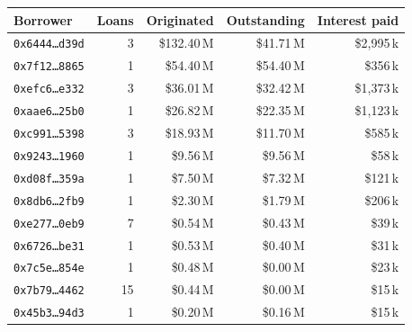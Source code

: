 \begin{tabular}{@{}lrrrr@{}}
\toprule
Borrower & Loans & Originated & Outstanding & Interest paid \\
\midrule
\texttt{0x6444\ldots{}d39d} & 3 & \$132.40\,M & \$41.71\,M & \$2,995\,k \\
\texttt{0x7f12\ldots{}8865} & 1 & \$54.40\,M & \$54.40\,M & \$356\,k \\
\texttt{0xefc6\ldots{}e332} & 3 & \$36.01\,M & \$32.42\,M & \$1,373\,k \\
\texttt{0xaae6\ldots{}25b0} & 1 & \$26.82\,M & \$22.35\,M & \$1,123\,k \\
\texttt{0xc991\ldots{}5398} & 3 & \$18.93\,M & \$11.70\,M & \$585\,k \\
\texttt{0x9243\ldots{}1960} & 1 & \$9.56\,M & \$9.56\,M & \$58\,k \\
\texttt{0xd08f\ldots{}359a} & 1 & \$7.50\,M & \$7.32\,M & \$121\,k \\
\texttt{0x8db6\ldots{}2fb9} & 1 & \$2.30\,M & \$1.79\,M & \$206\,k \\
\texttt{0xe277\ldots{}0eb9} & 7 & \$0.54\,M & \$0.43\,M & \$39\,k \\
\texttt{0x6726\ldots{}be31} & 1 & \$0.53\,M & \$0.40\,M & \$31\,k \\
\texttt{0x7c5e\ldots{}854e} & 1 & \$0.48\,M & \$0.00\,M & \$23\,k \\
\texttt{0x7b79\ldots{}4462} & 15 & \$0.44\,M & \$0.00\,M & \$15\,k \\
\texttt{0x45b3\ldots{}94d3} & 1 & \$0.20\,M & \$0.16\,M & \$15\,k \\
\bottomrule
\end{tabular}
